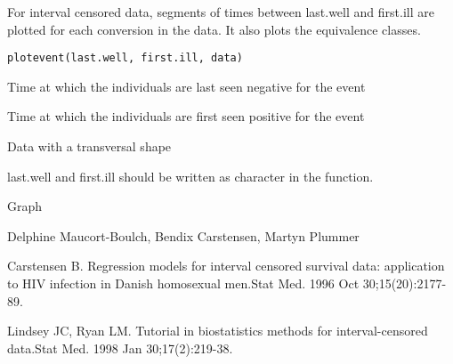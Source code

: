 \begin{Description}\relax
For interval censored data, segments of times between last.well and first.ill are plotted for each conversion in the data. It also plots the equivalence classes.
\end{Description}
\begin{Usage}
\begin{verbatim}
plotevent(last.well, first.ill, data)
\end{verbatim}
\end{Usage}
\begin{Arguments}
\begin{ldescription}
\item[\code{last.well}] Time at which the individuals are
last seen negative for the event 
\item[\code{first.ill}] Time at which the individuals are
first seen positive for the event 
\item[\code{data}] Data with a transversal shape 
\end{ldescription}
\end{Arguments}
\begin{Details}\relax
last.well and first.ill should be written as character in the function.
\end{Details}
\begin{Value}
Graph
\end{Value}
\begin{Author}\relax
Delphine Maucort-Boulch, Bendix Carstensen, Martyn Plummer
\end{Author}
\begin{References}\relax
Carstensen B. Regression models for interval censored survival data:
application to HIV infection in Danish homosexual men.Stat Med. 1996 Oct
30;15(20):2177-89. 

Lindsey JC, Ryan LM. Tutorial in biostatistics methods for
interval-censored data.Stat Med. 1998 Jan 30;17(2):219-38.
\end{References}
\begin{SeeAlso}\relax
{}
\end{SeeAlso}

